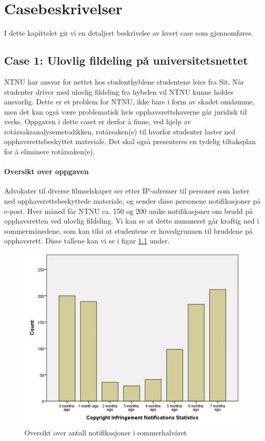 \chapter{Casebeskrivelser}
\label{kap:casebeskrivelser}
I dette kapittelet gir vi en detaljert beskrivelse av hvert case som gjennomføres. 

\section{Case 1: Ulovlig fildeling på universitetsnettet}
\label{sec:case_fildeling}
NTNU har ansvar for nettet hos studenthyblene studentene leier fra Sit. Når studenter driver med ulovlig fildeling fra hybelen vil NTNU kunne holdes ansvarlig. Dette er et problem for NTNU, ikke bare i form av skadet omdømme, men det kan også være problematisk hvis opphavsrettshaverne går juridisk til verks. Oppgaven i dette caset er derfor å finne, ved hjelp av rotårsaksanalysemetodikken, rotårsaken(e) til hvorfor studenter laster ned opphavsrettsbeskyttet materiale. Det skal også presenteres en tydelig tiltaksplan for å eliminere rotårsaken(e).

\subsubsection{Oversikt over oppgaven}
Advokater til diverse filmselskaper ser etter IP-adresser til personer som laster ned opphavsrettsbeskyttede materiale, og sender disse personene notifikasjoner på e-post. Hver måned får NTNU ca. 150 og 200 unike notifikasjoner om brudd på opphavsretten ved ulovlig fildeling. Vi kan se at dette nummeret går kraftig ned i sommermånedene, som kan tilsi at studentene er hovedgrunnen til bruddene på opphavsrett. Disse tallene kan vi se i figur \ref{fig:copyright} under.

\begin{figure}[H]
    \centering
    \includegraphics[scale=0.8]{case_1/bilder/copyright.jpg}
    \caption[Copyright Infringement Notifications]{Oversikt over antall notifikasjoner i sommerhalvåret}
    \label{fig:copyright}
\end{figure}

